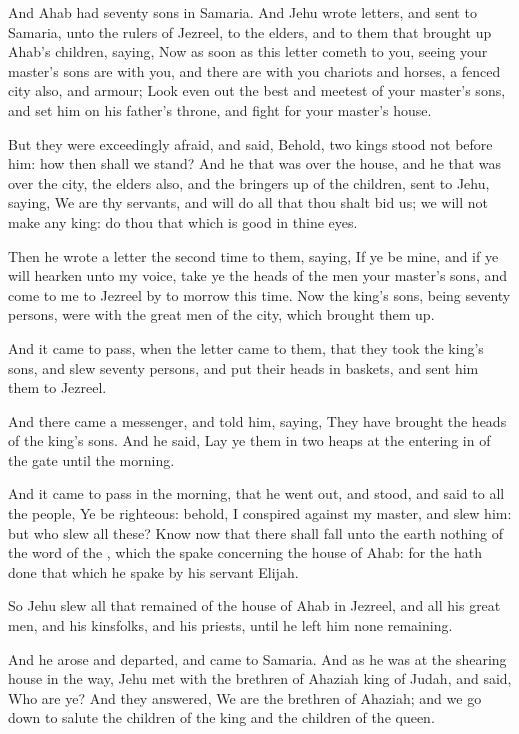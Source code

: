 \Chapter
\Verse And Ahab had seventy sons in Samaria. And Jehu wrote letters, and sent to Samaria, unto the rulers of Jezreel, to the elders, and to them that brought up Ahab's children, saying, \Verse Now as soon as this letter cometh to you, seeing your master's sons are with you, and there are with you chariots and horses, a fenced city also, and armour; \Verse Look even out the best and meetest of your master's sons, and set him on his father's throne, and fight for your master's house.

\Verse But they were exceedingly afraid, and said, Behold, two kings stood not before him: how then shall we stand?  \Verse And he that was over the house, and he that was over the city, the elders also, and the bringers up of the children, sent to Jehu, saying, We are thy servants, and will do all that thou shalt bid us; we will not make any king: do thou that which is good in thine eyes.

\Verse Then he wrote a letter the second time to them, saying, If ye be mine, and if ye will hearken unto my voice, take ye the heads of the men your master's sons, and come to me to Jezreel by to morrow this time. Now the king's sons, being seventy persons, were with the great men of the city, which brought them up.

\Verse And it came to pass, when the letter came to them, that they took the king's sons, and slew seventy persons, and put their heads in baskets, and sent him them to Jezreel.

\Verse And there came a messenger, and told him, saying, They have brought the heads of the king's sons. And he said, Lay ye them in two heaps at the entering in of the gate until the morning.

\Verse And it came to pass in the morning, that he went out, and stood, and said to all the people, Ye be righteous: behold, I conspired against my master, and slew him: but who slew all these?  \Verse Know now that there shall fall unto the earth nothing of the word of the \LORD, which the \LORD spake concerning the house of Ahab: for the \LORD hath done that which he spake by his servant Elijah.

\Verse So Jehu slew all that remained of the house of Ahab in Jezreel, and all his great men, and his kinsfolks, and his priests, until he left him none remaining.

\Verse And he arose and departed, and came to Samaria. And as he was at the shearing house in the way, \Verse Jehu met with the brethren of Ahaziah king of Judah, and said, Who are ye? And they answered, We are the brethren of Ahaziah; and we go down to salute the children of the king and the children of the queen.

